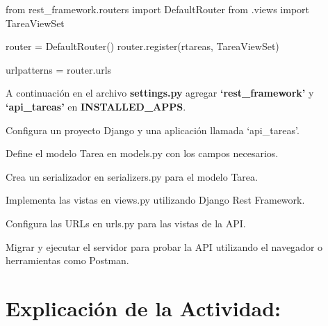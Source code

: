 \documentclass[
  a4paper,
  onepage,
  openany]{scrreprt}
\newenvironment{Shaded}{\begin{snugshade}}{\end{snugshade}}
\newcommand{\ImportTok}[1]{\textcolor[rgb]{0.00,0.46,0.62}{#1}}
\newcommand{\NormalTok}[1]{\textcolor[rgb]{0.00,0.23,0.31}{#1}}
\newcommand{\OperatorTok}[1]{\textcolor[rgb]{0.37,0.37,0.37}{#1}}
\newcommand{\VerbatimStringTok}[1]{\textcolor[rgb]{0.13,0.47,0.30}{#1}}
\begin{document}
\begin{Shaded}
\begin{Highlighting}[]
\ImportTok{from}\NormalTok{ rest\_framework.routers }\ImportTok{import}\NormalTok{ DefaultRouter}
\ImportTok{from}\NormalTok{ .views }\ImportTok{import}\NormalTok{ TareaViewSet}

\NormalTok{router }\OperatorTok{=}\NormalTok{ DefaultRouter()}
\NormalTok{router.register(}\VerbatimStringTok{r\textquotesingle{}tareas\textquotesingle{}}\NormalTok{, TareaViewSet)}

\NormalTok{urlpatterns }\OperatorTok{=}\NormalTok{ router.urls}
\end{Highlighting}
\end{Shaded}

A continuación en el archivo \textbf{settings.py} agregar
\textbf{`rest\_framework'} y \textbf{`api\_tareas'} en
\textbf{INSTALLED\_APPS}.

\begin{tcolorbox}[enhanced jigsaw, breakable, opacityback=0, toptitle=1mm, coltitle=black, toprule=.15mm, rightrule=.15mm, colframe=quarto-callout-important-color-frame, opacitybacktitle=0.6, arc=.35mm, title=\textcolor{quarto-callout-important-color}{\faExclamation}\hspace{0.5em}{Actividad Práctica:}, titlerule=0mm, colbacktitle=quarto-callout-important-color!10!white, bottomtitle=1mm, bottomrule=.15mm, colback=white, left=2mm, leftrule=.75mm]

Configura un proyecto Django y una aplicación llamada `api\_tareas'.

Define el modelo Tarea en models.py con los campos necesarios.

Crea un serializador en serializers.py para el modelo Tarea.

Implementa las vistas en views.py utilizando Django Rest Framework.

Configura las URLs en urls.py para las vistas de la API.

Migrar y ejecutar el servidor para probar la API utilizando el navegador
o herramientas como Postman.

\end{tcolorbox}

\hypertarget{explicaciuxf3n-de-la-actividad-85}{%
\section{Explicación de la
Actividad:}\label{explicaciuxf3n-de-la-actividad-85}}
\end{document}

